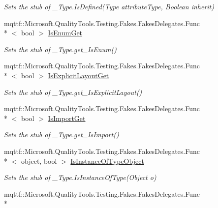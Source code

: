 \begin{DoxyCompactItemize}
\begin{DoxyCompactList}\small\item\em Sets the stub of \-\_\-\-Type.\-Is\-Defined(\-Type attribute\-Type, Boolean inherit)\end{DoxyCompactList}\item 
mqttf\-::\-Microsoft.\-Quality\-Tools.\-Testing.\-Fakes.\-Fakes\-Delegates.\-Func\\*
$<$ bool $>$ \hyperlink{class_system_1_1_runtime_1_1_interop_services_1_1_fakes_1_1_stub___type_ab4e50a12140be1d639dfb3052ab1b54e}{Is\-Enum\-Get}
\begin{DoxyCompactList}\small\item\em Sets the stub of \-\_\-\-Type.\-get\-\_\-\-Is\-Enum()\end{DoxyCompactList}\item 
mqttf\-::\-Microsoft.\-Quality\-Tools.\-Testing.\-Fakes.\-Fakes\-Delegates.\-Func\\*
$<$ bool $>$ \hyperlink{class_system_1_1_runtime_1_1_interop_services_1_1_fakes_1_1_stub___type_acc3cfb45433a532fb8796dbefe829f25}{Is\-Explicit\-Layout\-Get}
\begin{DoxyCompactList}\small\item\em Sets the stub of \-\_\-\-Type.\-get\-\_\-\-Is\-Explicit\-Layout()\end{DoxyCompactList}\item 
mqttf\-::\-Microsoft.\-Quality\-Tools.\-Testing.\-Fakes.\-Fakes\-Delegates.\-Func\\*
$<$ bool $>$ \hyperlink{class_system_1_1_runtime_1_1_interop_services_1_1_fakes_1_1_stub___type_acc84a50c59ab563ffbd0021fc17fc85d}{Is\-Import\-Get}
\begin{DoxyCompactList}\small\item\em Sets the stub of \-\_\-\-Type.\-get\-\_\-\-Is\-Import()\end{DoxyCompactList}\item 
mqttf\-::\-Microsoft.\-Quality\-Tools.\-Testing.\-Fakes.\-Fakes\-Delegates.\-Func\\*
$<$ object, bool $>$ \hyperlink{class_system_1_1_runtime_1_1_interop_services_1_1_fakes_1_1_stub___type_a8fc25573144ac884f02793bb1eb602e3}{Is\-Instance\-Of\-Type\-Object}
\begin{DoxyCompactList}\small\item\em Sets the stub of \-\_\-\-Type.\-Is\-Instance\-Of\-Type(\-Object o)\end{DoxyCompactList}\item 
mqttf\-::\-Microsoft.\-Quality\-Tools.\-Testing.\-Fakes.\-Fakes\-Delegates.\-Func\\*

\end{DoxyCompactItemize}
